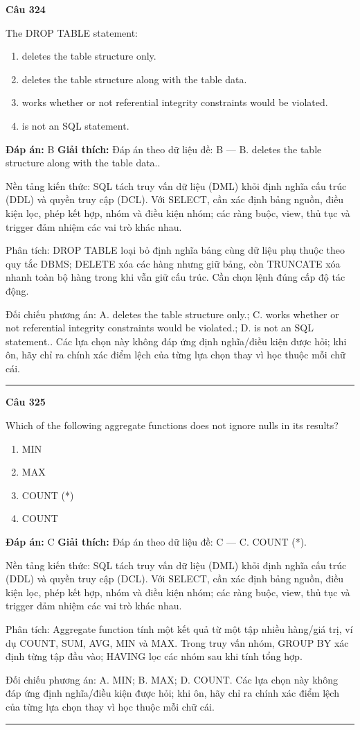 \documentclass[11pt,a4paper]{article}
\newenvironment{question}[1]{%
  \par\vspace{1em}\noindent\textbf{\large Câu #1}\par\vspace{0.4em}
}{%
  \par\vspace{1em}\hrule\vspace{0.6em}
}
\newenvironment{choices}{%
  \begin{enumerate}[label=\textbf{\Alph*.},leftmargin=2.2em,itemsep=2pt,topsep=3pt]
}{%
  \end{enumerate}
}
\newcommand{\choice}{\item}
\begin{document}
\begin{question}{324}
The DROP TABLE statement:
\begin{choices}
\choice deletes the table structure only.
\choice deletes the table structure along with the table data.
\choice works whether or not referential integrity constraints would be violated.
\choice is not an SQL statement.
\end{choices}
\textbf{Đáp án:} B
\textbf{Giải thích:} Đáp án theo dữ liệu đề: B — B. deletes the table structure along with the table data..

Nền tảng kiến thức: SQL tách truy vấn dữ liệu (DML) khỏi định nghĩa cấu trúc (DDL) và quyền truy cập (DCL). Với SELECT, cần xác định bảng nguồn, điều kiện lọc, phép kết hợp, nhóm và điều kiện nhóm; các ràng buộc, view, thủ tục và trigger đảm nhiệm các vai trò khác nhau.

Phân tích: DROP TABLE loại bỏ định nghĩa bảng cùng dữ liệu phụ thuộc theo quy tắc DBMS; DELETE xóa các hàng nhưng giữ bảng, còn TRUNCATE xóa nhanh toàn bộ hàng trong khi vẫn giữ cấu trúc. Cần chọn lệnh đúng cấp độ tác động.

Đối chiếu phương án: A. deletes the table structure only.; C. works whether or not referential integrity constraints would be violated.; D. is not an SQL statement.. Các lựa chọn này không đáp ứng định nghĩa/điều kiện được hỏi; khi ôn, hãy chỉ ra chính xác điểm lệch của từng lựa chọn thay vì học thuộc mỗi chữ cái.
\end{question}

\begin{question}{325}
Which of the following aggregate functions does not ignore nulls in its results?
\begin{choices}
\choice MIN
\choice MAX
\choice COUNT (*)
\choice COUNT
\end{choices}
\textbf{Đáp án:} C
\textbf{Giải thích:} Đáp án theo dữ liệu đề: C — C. COUNT (*).

Nền tảng kiến thức: SQL tách truy vấn dữ liệu (DML) khỏi định nghĩa cấu trúc (DDL) và quyền truy cập (DCL). Với SELECT, cần xác định bảng nguồn, điều kiện lọc, phép kết hợp, nhóm và điều kiện nhóm; các ràng buộc, view, thủ tục và trigger đảm nhiệm các vai trò khác nhau.

Phân tích: Aggregate function tính một kết quả từ một tập nhiều hàng/giá trị, ví dụ COUNT, SUM, AVG, MIN và MAX. Trong truy vấn nhóm, GROUP BY xác định từng tập đầu vào; HAVING lọc các nhóm sau khi tính tổng hợp.

Đối chiếu phương án: A. MIN; B. MAX; D. COUNT. Các lựa chọn này không đáp ứng định nghĩa/điều kiện được hỏi; khi ôn, hãy chỉ ra chính xác điểm lệch của từng lựa chọn thay vì học thuộc mỗi chữ cái.
\end{question}
\end{document}

